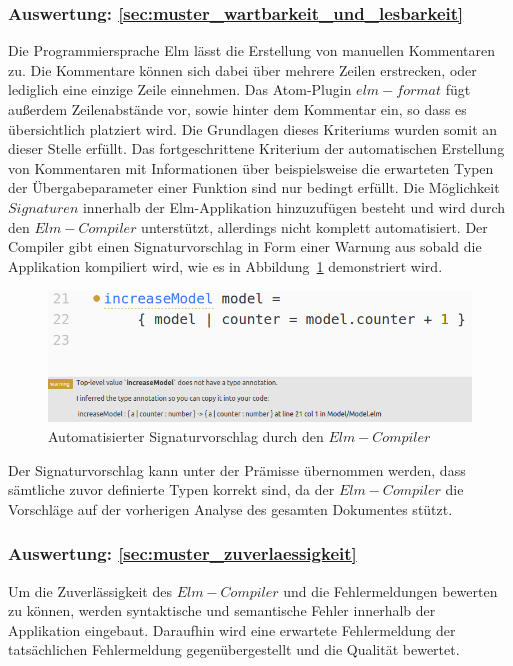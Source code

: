 \subsubsection{Auswertung: \ref{sec:muster_wartbarkeit_und_lesbarkeit} }
Die Programmiersprache Elm lässt die Erstellung von manuellen Kommentaren zu. Die Kommentare können sich dabei über mehrere Zeilen erstrecken, oder lediglich eine einzige Zeile einnehmen. Das Atom-Plugin $elm-format$ fügt außerdem Zeilenabstände vor, sowie hinter dem Kommentar ein, so dass es übersichtlich platziert wird. Die Grundlagen dieses Kriteriums wurden somit an dieser Stelle erfüllt. Das fortgeschrittene Kriterium der automatischen Erstellung von Kommentaren mit Informationen über beispielsweise die erwarteten Typen der Übergabeparameter einer Funktion sind nur bedingt erfüllt. Die Möglichkeit $Signaturen$ innerhalb der Elm-Applikation hinzuzufügen besteht und wird durch den $Elm-Compiler$ unterstützt, allerdings nicht komplett automatisiert. Der Compiler gibt einen Signaturvorschlag in Form einer Warnung aus sobald die Applikation kompiliert wird, wie es in Abbildung~\ref{fig:compiler-signature-suggestion} demonstriert wird.
\begin{figure}[h]
\centering
\includegraphics[scale=0.52]{img/compiler_sig_suggestion.png}
\caption{Automatisierter Signaturvorschlag durch den $Elm-Compiler$}\label{fig:compiler-signature-suggestion}
\end{figure}
Der Signaturvorschlag kann unter der Prämisse übernommen werden, dass sämtliche zuvor definierte Typen korrekt sind, da der $Elm-Compiler$ die Vorschläge auf der vorherigen Analyse des gesamten Dokumentes stützt.

\subsubsection{Auswertung: \ref{sec:muster_zuverlaessigkeit} }
Um die Zuverlässigkeit des $Elm-Compiler$ und die Fehlermeldungen bewerten zu können, werden syntaktische und semantische Fehler innerhalb der Applikation eingebaut. Daraufhin wird eine erwartete Fehlermeldung der tatsächlichen Fehlermeldung gegenübergestellt und die Qualität bewertet.
\\

